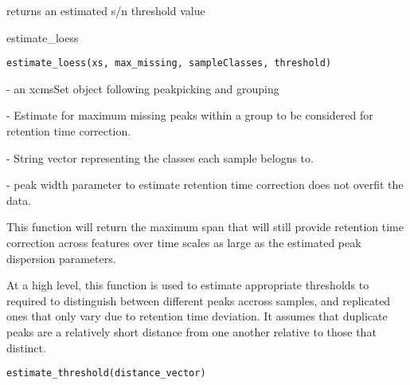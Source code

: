 \documentclass[a4paper]{book}
\begin{document}
%
\begin{Value}
returns an estimated s/n threshold value
\end{Value}
%
\begin{Description}\relax
estimate\_loess
\end{Description}
%
\begin{Usage}
\begin{verbatim}
estimate_loess(xs, max_missing, sampleClasses, threshold)
\end{verbatim}
\end{Usage}
%
\begin{Arguments}
\begin{ldescription}
\item[\code{xs}] - an xcmsSet object following peakpicking and grouping

\item[\code{max\_missing}] - Estimate for maximum missing peaks within a group to
be considered for retention time correction.

\item[\code{sampleClasses}] - String vector representing the classes each sample
belogns to.

\item[\code{threshold}] - peak width parameter to estimate retention time
correction does not overfit the data.
\end{ldescription}
\end{Arguments}
%
\begin{Value}
This function will return the maximum span that will still
provide retention time correction across features over time scales
as large as the estimated peak dispersion parameters.
\end{Value}
%
\begin{Description}\relax
At a high level, this function is used to estimate appropriate
thresholds to required to distinguish between different peaks accross
samples, and replicated ones that only vary due to retention time deviation.
It assumes that duplicate peaks are a relatively short distance from one
another relative to those that distinct.
\end{Description}
%
\begin{Usage}
\begin{verbatim}
estimate_threshold(distance_vector)
\end{verbatim}
\end{Usage}
\end{document}
